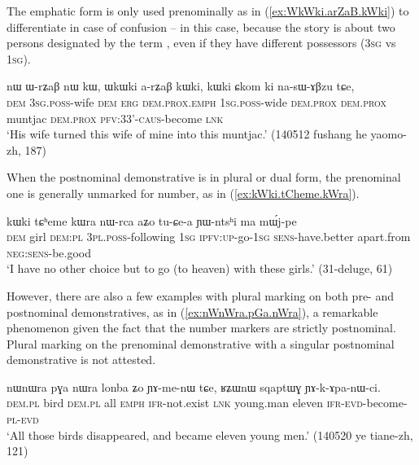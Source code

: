 The emphatic form is only used prenominally as in (\ref{ex:WkWki.arZaB.kWki}) to differentiate in case of confusion -- in this case, because the story is about two persons designated by the term , even if they have different possessors (\textsc{3sg} vs \textsc{1sg}).

\begin{exe}
\ex \label{ex:WkWki.arZaB.kWki}
 \gll   nɯ ɯ-rʑaβ nɯ kɯ, ɯkɯki a-rʑaβ kɯki, kɯki ɕkom ki na-sɯ-ɤβzu tɕe, \\
 \textsc{dem} \textsc{3sg}.\textsc{poss}-wife \textsc{dem} \textsc{erg} \textsc{dem}.\textsc{prox}.\textsc{emph} \textsc{1sg}.\textsc{poss}-wide \textsc{dem}.\textsc{prox} \textsc{dem}.\textsc{prox} muntjac \textsc{dem}.\textsc{prox}  \textsc{pfv}:3\fl{}3'-\textsc{caus}-become \textsc{lnk} \\
\glt `His wife turned this wife of mine into this muntjac.' (140512 fushang he yaomo-zh, 187)
\end{exe}

When the postnominal demonstrative is in plural or dual form, the prenominal one is generally unmarked for number, as in (\ref{ex:kWki.tCheme.kWra}).

\begin{exe}
\ex \label{ex:kWki.tCheme.kWra}
 \gll kɯki tɕʰeme kɯra nɯ-rca aʑo tu-ɕe-a ɲɯ-ntsʰi ma mɯ́j-pe \\
 \textsc{dem} girl \textsc{dem}:\textsc{pl} \textsc{3pl}.\textsc{poss}-following \textsc{1sg} \textsc{ipfv}:\textsc{up}-go-\textsc{1sg} \textsc{sens}-have.better apart.from \textsc{neg}:\textsc{sens}-be.good \\
 \glt `I have no other choice but to go (to heaven) with these girls.' (31-deluge, 61)
 \end{exe}

However, there are also a few examples with plural marking on both pre- and postnominal demonstratives, as in (\ref{ex:nWnWra.pGa.nWra}), a remarkable phenomenon given the fact that the number markers are strictly postnominal. Plural marking on the prenominal demonstrative with a singular postnominal demonstrative is not attested.
 
\begin{exe}
\ex \label{ex:nWnWra.pGa.nWra}
 \gll nɯnɯra pɣa nɯra lonba ʑo ɲɤ-me-nɯ tɕe, ʁʑɯnɯ sqaptɯɣ ɲɤ-k-ɤpa-nɯ-ci. \\
 \textsc{dem.pl} bird  \textsc{dem.pl}  all \textsc{emph} \textsc{ifr}-not.exist \textsc{lnk} young.man eleven \textsc{ifr}-\textsc{evd}-become-\textsc{pl}-\textsc{evd} \\
 \glt `All those birds disappeared, and became eleven young men.' (140520 ye tiane-zh, 121)
\end{exe}

